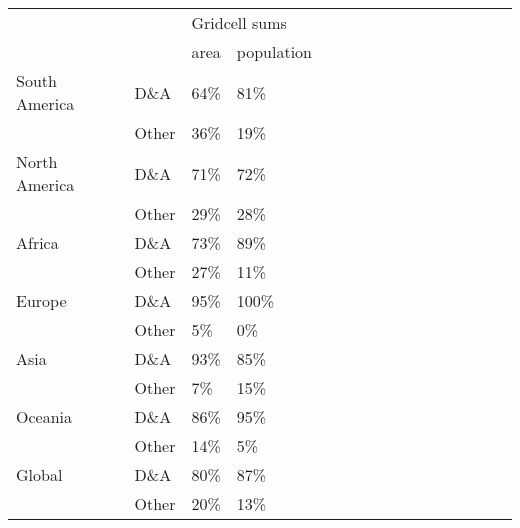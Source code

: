 \begin{tabular}{ll p{1cm} p{1cm} p{1cm} p{1cm} p{1cm} p{1cm} p{1cm} p{1cm} p{1cm} p{1cm} p{1cm} p{1cm} p{1cm} p{1cm}}
\toprule
       &       & \multicolumn{2}{L{2cm}}{Gridcell sums} \\
       &       &          area & population \\
\midrule
South America & D\&A &          64\% &       81\% \\
       & Other &          36\% &       19\% \\
North America & D\&A &          71\% &       72\% \\
       & Other &          29\% &       28\% \\
Africa & D\&A &          73\% &       89\% \\
       & Other &          27\% &       11\% \\
Europe & D\&A &          95\% &      100\% \\
       & Other &           5\% &        0\% \\
Asia & D\&A &          93\% &       85\% \\
       & Other &           7\% &       15\% \\
Oceania & D\&A &          86\% &       95\% \\
       & Other &          14\% &        5\% \\
Global & D\&A &          80\% &       87\% \\
       & Other &          20\% &       13\% \\
\bottomrule
\end{tabular}
